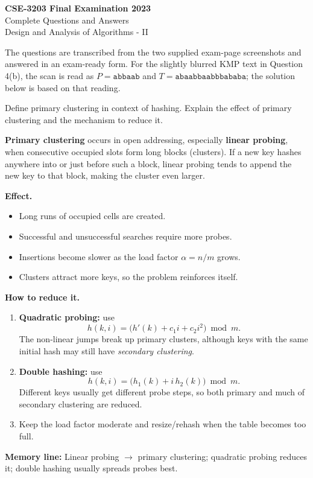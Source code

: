 \documentclass[11pt,a4paper]{article}
\begin{document}
\begin{center}
{\Huge\bfseries\color{primary} CSE-3203 Final Examination 2023}\\[0.25em]
{\Large\color{deepnavy} Complete Questions and Answers}\\[0.35em]
{\normalsize Design and Analysis of Algorithms - II}
\end{center}

\begin{pointbox}
The questions are transcribed from the two supplied exam-page screenshots and answered in an exam-ready form. For the slightly blurred KMP text in Question 4(b), the scan is read as \(P=\texttt{abbaab}\) and \(T=\texttt{abaabbaabbbababa}\); the solution below is based on that reading.
\end{pointbox}

\begin{qaquestion}
Define primary clustering in context of hashing. Explain the effect of primary clustering and the mechanism to reduce it.
\end{qaquestion}
\begin{qaanswer}[Answer 1(a)]
\textbf{Primary clustering} occurs in open addressing, especially \textbf{linear probing}, when consecutive occupied slots form long blocks (clusters). If a new key hashes anywhere into or just before such a block, linear probing tends to append the new key to that block, making the cluster even larger.

\textbf{Effect.}
\begin{itemize}[leftmargin=*]
\item Long runs of occupied cells are created.
\item Successful and unsuccessful searches require more probes.
\item Insertions become slower as the load factor \(\alpha=n/m\) grows.
\item Clusters attract more keys, so the problem reinforces itself.
\end{itemize}

\textbf{How to reduce it.}
\begin{enumerate}[leftmargin=*]
\item \textbf{Quadratic probing:} use
\[
h(k,i)=\bigl(h'(k)+c_1i+c_2i^2\bigr)\bmod m.
\]
The non-linear jumps break up primary clusters, although keys with the same initial hash may still have \emph{secondary clustering}.
\item \textbf{Double hashing:} use
\[
h(k,i)=\bigl(h_1(k)+i\,h_2(k)\bigr)\bmod m.
\]
Different keys usually get different probe steps, so both primary and much of secondary clustering are reduced.
\item Keep the load factor moderate and resize/rehash when the table becomes too full.
\end{enumerate}

\textbf{Memory line:} Linear probing \(\to\) primary clustering; quadratic probing reduces it; double hashing usually spreads probes best.
\end{qaanswer}
\end{document}
